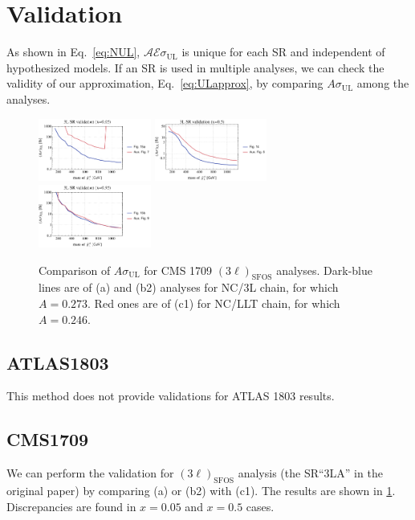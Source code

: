 \documentclass[a4paper,10pt,captions=tableheading,DIV=14]{scrartcl}
\numberwithin{equation}{section}
\newcommand\w[1]{_{\mathrm{#1}}}
\begin{document}
\clearpage

\section{Validation}
As shown in Eq.~\eqref{eq:NUL}, $\mathcal A\mathcal E\sigma\w{UL}$ is unique for each SR and independent of hypothesized models.
If an SR is used in multiple analyses, we can check the validity of our approximation, Eq.~\eqref{eq:ULapprox}, by comparing $A\sigma\w{UL}$ among the analyses.


\begin{figure}[h]
 \includegraphics[width=0.33\textwidth]{../plots/validation_cms1709_SRA_tab1_005.pdf}
 \includegraphics[width=0.33\textwidth]{../plots/validation_cms1709_SRA_tab1_050.pdf}
 \includegraphics[width=0.33\textwidth]{../plots/validation_cms1709_SRA_tab1_095.pdf}
 \caption{\label{fig:valCMS1709}Comparison of $A\sigma\w{UL}$ for CMS 1709 $(3\ell)\w{SFOS}$ analyses. Dark-blue lines are of (a) and (b2) analyses for NC/3L chain, for which $A=0.273$. Red  ones are of (c1) for NC/LLT chain, for which $A=0.246$.}
\end{figure}


\subsection{ATLAS1803}
This method does not provide validations for ATLAS 1803 results.

\subsection{CMS1709}
We can perform the validation for $(3\ell)\w{SFOS}$ analysis (the SR``3LA'' in the original paper) by comparing (a) or (b2) with (c1).
The results are shown in \cref{fig:valCMS1709}.
Discrepancies are found in $x=0.05$ and $x=0.5$ cases.
\end{document}

